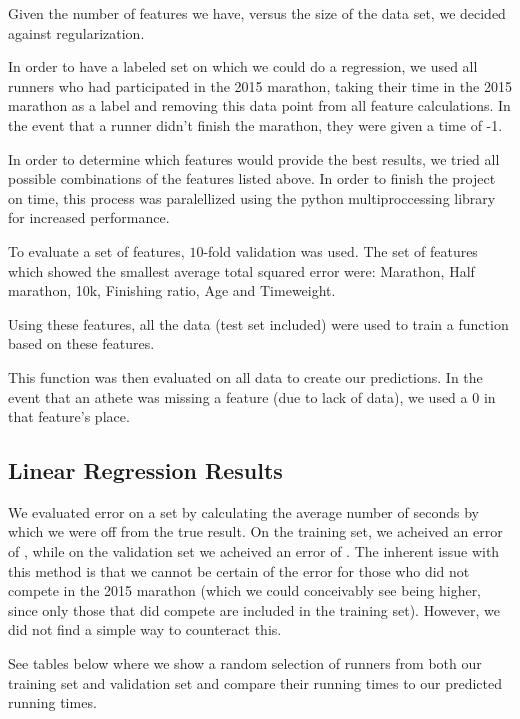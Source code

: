\documentclass{article}
\begin{document}
Given the number of features we have, versus the size of the data set, we decided against regularization.

In order to have a labeled set on which we could do a regression, we used all runners who had participated in the 2015 marathon,
taking their time in the 2015 marathon as a label and removing this data point from all feature calculations. 
In the event that a runner didn't finish the marathon, they were given a time of -1.

In order to determine which features would provide the best results, we tried all possible combinations
of the features listed above. In order to finish the project on time, this process was paralellized using 
the python multiproccessing library for increased performance.

To evaluate a set of features, $10$-fold validation was used. The set of features which showed the smallest
average total squared error were: Marathon, Half marathon, 10k, Finishing ratio, Age and Timeweight.

Using these features, all the data (test set included) were used to train a function based on these features.

This function was then evaluated on all data to create our predictions. In the event that an athete was missing a feature (due to lack of data),
we used a $0$ in that feature's place.


\subsection*{Linear Regression Results}


We evaluated error on a set by calculating the average number of seconds by which we were off 
from the true result.
On the training set, we acheived an error of , while on the validation set we acheived an error of .
The inherent issue with this method is that we cannot be certain of the error for those who did not compete 
in the 2015 marathon (which we could conceivably see being higher, since only those that did compete
are included in the training set). However, we did not find a simple way to counteract this.


See tables %
below where we show a random selection of runners from both our training set and validation set
and compare their running times to our predicted running times. 
\end{document}
